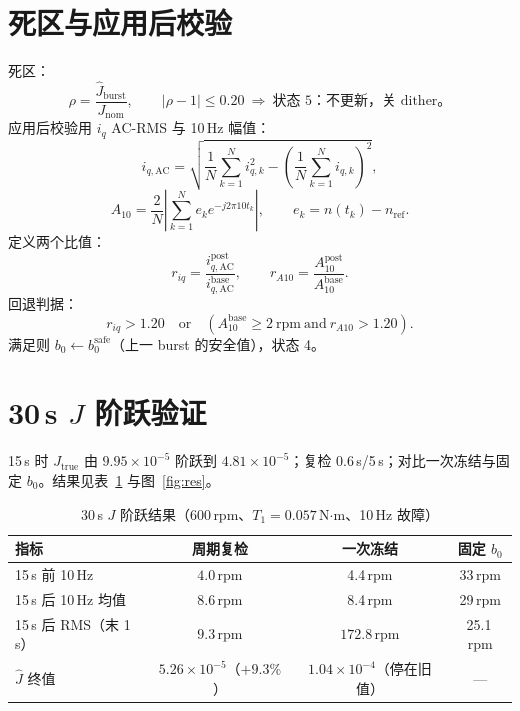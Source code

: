 \documentclass[11pt,a4paper]{article}
\newcommand{\Jnom}{J_{\mathrm{nom}}}
\newcommand{\Jtrue}{J_{\mathrm{true}}}
\newcommand{\Jhat}{\hat J}
\newcommand{\bzero}{b_0}
\newcommand{\rpm}{\mathrm{rpm}}
\begin{document}
\section{死区与应用后校验}

死区：
\begin{equation}
\rho=\frac{\Jhat_{\mathrm{burst}}}{\Jnom},\qquad
\left|\rho-1\right|\le0.20
\ \Longrightarrow\ \text{状态 5：不更新，关 dither。}
\label{eq:dead}
\end{equation}
应用后校验用 $i_q$ AC-RMS 与 10\,Hz 幅值：
\begin{equation}
i_{q,\mathrm{AC}}=\sqrt{\frac{1}{N}\sum_{k=1}^{N}i_{q,k}^2-\left(\frac{1}{N}\sum_{k=1}^{N}i_{q,k}\right)^2},
\label{eq:iqac}
\end{equation}
\begin{equation}
A_{10}=\frac{2}{N}\left|\sum_{k=1}^{N}e_ke^{-j2\pi10t_k}\right|,\qquad
e_k=n(t_k)-n_{\mathrm{ref}}.
\label{eq:a10}
\end{equation}
定义两个比值：
\begin{equation}
r_{iq}=\frac{i_{q,\mathrm{AC}}^{\mathrm{post}}}{i_{q,\mathrm{AC}}^{\mathrm{base}}},
\qquad
r_{A10}=\frac{A_{10}^{\mathrm{post}}}{A_{10}^{\mathrm{base}}}.
\label{eq:ratios}
\end{equation}
回退判据：
\begin{equation}
r_{iq}>1.20
\quad\text{or}\quad
\left(A_{10}^{\mathrm{base}}\ge2\ \rpm\ \text{and}\ r_{A10}>1.20\right).
\label{eq:rollback}
\end{equation}
满足则 $\bzero\leftarrow\bzero^{\mathrm{safe}}$（上一 burst 的安全值），状态 4。

\clearpage
\section{30\,s $J$ 阶跃验证}

15\,s 时 $\Jtrue$ 由 $9.95\times10^{-5}$ 阶跃到 $4.81\times10^{-5}$；复检 0.6\,s/5\,s；对比一次冻结与固定 $\bzero$。结果见表~\ref{tab:res} 与图~\ref{fig:res}。

\begin{table}[H]
\centering\footnotesize
\caption{30\,s $J$ 阶跃结果（600\,rpm、$T_1=0.057$\,N$\cdot$m、10\,Hz 故障）}\label{tab:res}
\begin{tabular}{@{}lccc@{}}
\toprule
指标 & 周期复检 & 一次冻结 & 固定 $\bzero$\\
\midrule
15\,s 前 10\,Hz & $\mathbf{4.0}$\,rpm & 4.4\,rpm & 33\,rpm\\
15\,s 后 10\,Hz 均值 & 8.6\,rpm & 8.4\,rpm & 29\,rpm\\
15\,s 后 RMS（末 1\,s） & $\mathbf{9.3}$\,rpm & $\mathbf{172.8}$\,rpm & 25.1\,rpm\\
$\Jhat$ 终值 & $5.26\times10^{-5}$（$+9.3\%$） & $1.04\times10^{-4}$（停在旧值） & ---\\
\bottomrule
\end{tabular}
\end{table}
\end{document}
